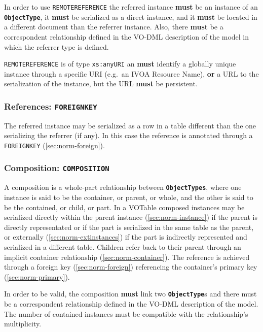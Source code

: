 \documentclass[11pt,a4paper]{ivoa}
\begin{document}
In order to use \texttt{REMOTEREFERENCE} the referred instance
\textbf{must} be an instance of an \textbf{\texttt{ObjectType}}, it
\textbf{must} be serialized as a direct instance, and it \textbf{must}
be located in a different document than the referrer instance. Also,
there \textbf{must} be a correspondent relationship defined in the
VO-DML description of the model in which the referrer type is defined.

\texttt{REMOTEREFERENCE} is of type \texttt{xs:anyURI} an \textbf{must}
identify a globally unique instance through a specific URI (e.g.~an IVOA
Resource Name), \textbf{or} a URL to the serialization of the instance,
but the URL \textbf{must} be persistent.

\subsubsection{References:
\texttt{FOREIGNKEY}}\label{sec:norm-reference-foreignkey}

The referred instance may be serialized as a row in a table different
than the one serializing the referrer (if any). In this case the
reference is annotated through a \texttt{FOREIGNKEY}
(\ref{sec:norm-foreign}).

\subsubsection{Composition:
\texttt{COMPOSITION}}\label{sec:norm-composition}

A composition is a whole-part relationship between
\textbf{\texttt{ObjectTypes}}, where one instance is said to be the
container, or parent, or whole, and the other is said to be the
contained, or child, or part. In a VOTable composed instances may be
serialized directly within the parent instance
(\ref{sec:norm-instance}) if the parent is directly representated or if
the part is serialized in the same table as the parent, or externally
(\ref{sec:norm-extinstances}) if the part is indirectly represented and
serialized in a different table. Children refer back to their parent
through an implicit container relationship (\ref{sec:norm-container}).
The reference is achieved through a foreign key
(\ref{sec:norm-foreign}) referencing the container's primary key
(\ref{sec:norm-primary}).

In order to be valid, the composition \textbf{must} link two
\textbf{\texttt{ObjectType}}s and there must be a correspondent
relationship defined in the VO-DML description of the model. The number
of contained instances must be compatible with the relationship's
multiplicity.
\end{document}
